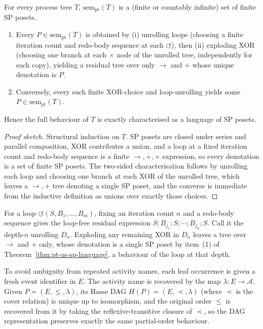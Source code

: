 \begin{theorem}\label{thm:pt-as-sp-language}
  For every process tree $T$, $\mathrm{sem}_{\mathrm{pt}}(T)$ is a (finite or countably infinite) set of finite SP posets.
  \begin{enumerate}
    \item Every $P\in\mathrm{sem}_{\mathrm{pt}}(T)$ is obtained by
      (i) unrolling loops (choosing a finite iteration count and redo-body sequence at each $\circlearrowleft$),
      then (ii) exploding XOR (choosing one branch at each $\times$ node of the unrolled tree, independently for each copy),
      yielding a residual tree over only $\to$ and $+$ whose unique denotation is $P$.
    \item Conversely, every such finite XOR-choice and loop-unrolling yields some $P\in\mathrm{sem}_{\mathrm{pt}}(T)$.
  \end{enumerate}
  Hence the full behaviour of $T$ is exactly characterised as a language of SP posets.
\end{theorem}

\begin{proof}[Proof sketch]
  Structural induction on $T$. SP posets are closed under series and parallel composition, XOR
  contributes a union, and a loop at a fixed iteration count and redo-body sequence is a finite
  $\to,+,\times$ expression, so every denotation is a set of finite SP posets. The two-sided
  characterisation follows by unrolling each loop and choosing one branch at each XOR of the
  unrolled tree, which leaves a $\to,+$ tree denoting a single SP poset, and the converse is
  immediate from the inductive definition as unions over exactly those choices.
\end{proof}

\begin{remark}\label{rem:depth-n-unrolling}
For a loop $\circlearrowleft(S,B_1,\dots,B_m)$, fixing an iteration count $n$ and a redo-body sequence gives the loop-free residual expression $S;B_{j_1};S;\cdots;B_{j_n};S$. Call it the depth-$n$ unrolling $D_n$. Exploding any remaining XOR in $D_n$ leaves a tree over $\to$ and $+$ only, whose denotation is a single SP poset by item~(1) of Theorem~\ref{thm:pt-as-sp-language}, a behaviour of the loop at that depth.
\end{remark}

\begin{remark}\label{rem:unique-occurrence-dag}
  To avoid ambiguity from repeated activity names, each leaf occurrence is given a fresh event identifier in $E$.
  The activity name is recovered by the map $\lambda:E\to\mathcal{A}$.
  Given $P=(E,\leq,\lambda)$, its Hasse DAG $H(P)=(E,\prec,\lambda)$ (where $\prec$ is the cover relation) is unique up to isomorphism, and the original order $\leq$ is recovered from it by taking the reflexive-transitive closure of $\prec$, so the DAG representation preserves exactly the same partial-order behaviour.
\end{remark}

